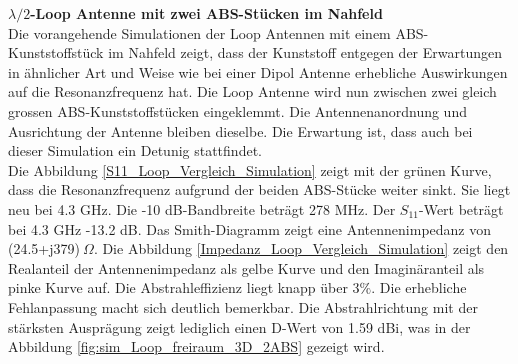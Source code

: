 

\textbf{$\lambda/2$-Loop Antenne mit zwei ABS-Stücken im Nahfeld}\\
Die vorangehende Simulationen der Loop Antennen mit einem ABS-Kunststoffstück im Nahfeld zeigt, dass der Kunststoff entgegen der Erwartungen in ähnlicher Art und Weise wie bei einer Dipol Antenne erhebliche Auswirkungen auf die Resonanzfrequenz hat. Die Loop Antenne wird nun zwischen zwei gleich grossen ABS-Kunststoffstücken eingeklemmt. Die Antennenanordnung und Ausrichtung der Antenne bleiben dieselbe. Die Erwartung ist, dass auch bei dieser Simulation ein Detunig stattfindet.\\ 
Die Abbildung \ref{S11_Loop_Vergleich_Simulation} zeigt mit der grünen Kurve, dass die Resonanzfrequenz aufgrund der beiden ABS-Stücke weiter sinkt. Sie liegt neu bei 4.3 GHz. Die -10 dB-Bandbreite beträgt 278 MHz. Der $S_{11}$-Wert beträgt bei 4.3 GHz -13.2 dB. Das Smith-Diagramm zeigt eine Antennenimpedanz von (24.5+j379)$\ \Omega$. Die Abbildung \ref{Impedanz_Loop_Vergleich_Simulation} zeigt den Realanteil der Antennenimpedanz als gelbe Kurve und den Imaginäranteil als pinke Kurve auf. Die Abstrahleffizienz liegt knapp über $3\%$. Die erhebliche Fehlanpassung macht sich deutlich bemerkbar. Die Abstrahlrichtung mit der stärksten Ausprägung zeigt lediglich einen D-Wert von 1.59 dBi, was in der Abbildung \ref{fig:sim_Loop_freiraum_3D_2ABS} gezeigt wird.


